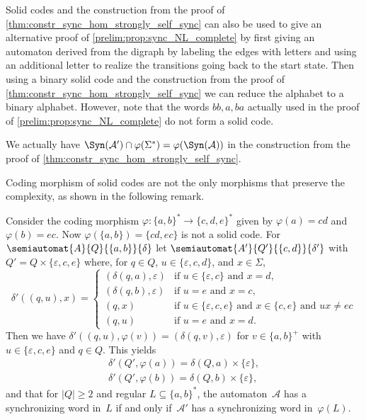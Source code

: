 \begin{remark}
	Solid codes and the construction from the proof of  \cref{thm:constr_sync_hom_strongly_self_sync}
	can also be used to give an alternative proof of \cref{prelim:prop:sync_NL_complete}
	by first giving an automaton derived from the digraph
    by labeling the edges with letters and using an additional letter
    to realize the transitions going back to the start state.
    Then using a binary solid code
    and the construction from the proof of \cref{thm:constr_sync_hom_strongly_self_sync}
    we can reduce the alphabet to a binary alphabet.
    However, note that the words $bb,a,ba$ actually used in the proof of \cref{prelim:prop:sync_NL_complete}
    do not form a solid code.
\end{remark}

\begin{remark}
	We actually have $\Syn(\mathcal A') \cap \varphi(\Sigma^*) = \varphi(\Syn(\mathcal A))$
	in the construction from the proof of \cref{thm:constr_sync_hom_strongly_self_sync}.
\end{remark}

Coding morphism of solid codes are not the only morphisms
that preserve the complexity, as shown in the following remark.

\begin{remark}
	Consider the coding morphism $\varphi \colon \{a,b\}^* \to \{c,d, e\}^*$
	given by $\varphi(a) = cd$ and $\varphi(b) = ec$.
	Now $\varphi(\{a,b\}) = \{cd, ec\}$ is not a solid code.
	For $\semiautomat{A}{Q}{\{a,b\}}{\delta}$
	let 
	$\semiautomat{A'}{Q'}{\{c,d\}}{\delta'}$
	with $Q' = Q \times \{\varepsilon, c, e\}$
	where, for $q \in Q$, $u \in \{\varepsilon,c,d\}$, and $x \in \Sigma$,
	\[
	\delta'((q, u), x)
	= 
	\begin{cases}
		(\delta(q, a), \varepsilon)  & \text{if } u \in \{\varepsilon,c\} \text{ and } x = d, \\
		(\delta(q, b), \varepsilon)  & \text{if } u = e \text{ and } x = c, \\
		(q,x)                        & \text{if } u \in \{\varepsilon,c,e\} \text{ and } x \in \{c,e\} \text{ and } ux \ne ec \\
		(q,u)                        & \text{if } u = e \text{ and } x = d.
	\end{cases}
	\]
	Then we have $\delta'((q, u), \varphi(v)) = (\delta(q, v), \varepsilon)$
	for $v \in \{a,b\}^+$ with $u \in \{\varepsilon, c, e\}$
	and $q \in Q$.
	This yields 
	\begin{align*}
		\delta'(Q', \varphi(a)) = \delta(Q, a) \times \{\varepsilon\}, \\
		\delta'(Q', \varphi(b)) = \delta(Q, b) \times \{\varepsilon\},	
	\end{align*}
	and	that for $|Q| \ge 2$ and regular $L \subseteq \{a,b\}^*$,
	the automaton~$\mathcal A$ has a synchronizing word in~$L$
	if and only if~$\mathcal A'$ has a synchronizing word in~$\varphi(L)$.
\end{remark}